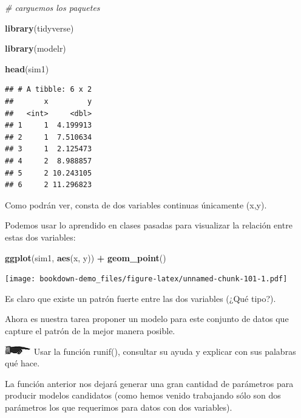 \documentclass[]{book}
\newenvironment{Shaded}{\begin{snugshade}}{\end{snugshade}}
\newcommand{\KeywordTok}[1]{\textcolor[rgb]{0.13,0.29,0.53}{\textbf{#1}}}
\newcommand{\StringTok}[1]{\textcolor[rgb]{0.31,0.60,0.02}{#1}}
\newcommand{\CommentTok}[1]{\textcolor[rgb]{0.56,0.35,0.01}{\textit{#1}}}
\newcommand{\OperatorTok}[1]{\textcolor[rgb]{0.81,0.36,0.00}{\textbf{#1}}}
\newcommand{\NormalTok}[1]{#1}
\theoremstyle{definition}
\theoremstyle{definition}
\theoremstyle{definition}
\theoremstyle{remark}
\begin{document}
\begin{Shaded}
\begin{Highlighting}[]
\CommentTok{# carguemos los paquetes}

\KeywordTok{library}\NormalTok{(tidyverse)}

\KeywordTok{library}\NormalTok{(modelr)}

\KeywordTok{head}\NormalTok{(sim1)}
\end{Highlighting}
\end{Shaded}

\begin{verbatim}
## # A tibble: 6 x 2
##       x         y
##   <int>     <dbl>
## 1     1  4.199913
## 2     1  7.510634
## 3     1  2.125473
## 4     2  8.988857
## 5     2 10.243105
## 6     2 11.296823
\end{verbatim}

Como podrán ver, consta de dos variables continuas únicamente (x,y).

Podemos usar lo aprendido en clases pasadas para visualizar la relación
entre estas dos variables:

\begin{Shaded}
\begin{Highlighting}[]
\KeywordTok{ggplot}\NormalTok{(sim1, }\KeywordTok{aes}\NormalTok{(x, y)) }\OperatorTok{+}\StringTok{ }
\StringTok{  }\KeywordTok{geom_point}\NormalTok{()}
\end{Highlighting}
\end{Shaded}

\texttt{[image: bookdown-demo\_files/figure-latex/unnamed-chunk-101-1.pdf]}

Es claro que existe un patrón fuerte entre las dos variables (¿Qué
tipo?).

Ahora es nuestra tarea proponer un modelo para este conjunto de datos
que capture el patrón de la mejor manera posible.

\includegraphics{./imagenes/manicule2.jpg} Usar la función runif(),
consultar su ayuda y explicar con sus palabras qué hace.

La función anterior nos dejará generar una gran cantidad de parámetros
para producir modelos candidatos (como hemos venido trabajando sólo son
dos parámetros los que requerimos para datos con dos variables).
\end{document}
